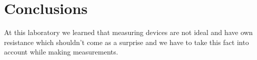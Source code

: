 \section{Conclusions}

At this laboratory we learned that measuring devices are not ideal and have own resistance which shouldn’t come as a surprise and we have to take this fact into account while making measurements. 

